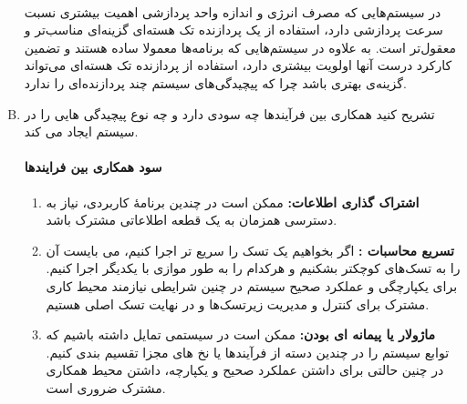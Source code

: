 \documentclass[]{article}
\begin{document}
\begin{enumerate}[(A)]
          \\
          در سیستم‌هایی که مصرف انرژی و اندازه واحد پردازشی اهمیت بیشتری نسبت سرعت پردازشی دارد،
          استفاده از یک پردازنده تک هسته‌ای گزینه‌ای مناسب‌تر و معقول‌تر است. به علاوه در سیستم‌هایی که
          برنامه‌ها معمولا ساده هستند و تضمین کارکرد درست آنها اولویت بیشتری دارد، استفاده از پردازنده تک هسته‌ای
          می‌تواند گزینه‌ی بهتری باشد چرا که پیچیدگی‌های سیستم چند پردازنده‌ای را ندارد.
          \pagebreak
    \item ﺗﺸﺮﯾﺢ ﮐﻨﯿﺪ ﻫﻤﮑﺎﺭﯼ ﺑﯿﻦ ﻓﺮﺁﯾﻨﺪﻫﺎ ﭼﻪ ﺳﻮﺩﯼ ﺩﺍﺭﺩ ﻭ ﭼﻪ ﻧﻮﻉ ﭘﯿﭽﯿﺪﮔﯽ ﻫﺎﯾﯽ ﺭﺍ ﺩﺭ ﺳﯿﺴﺘﻢ ﺍﯾﺠﺎﺩ ﻣﯽ ﮐﻨﺪ.
          \vspace{-0.5cm}
          \paragraph*{سود همکاری بین فرایندها}
          \begin{enumerate}[-]
              \item \textbf{اشتراک گذاری اطلاعات:}
                    ممکن است در چندین برنامۀ کاربردی، نیاز به دسترسی همزمان به یک قطعه اطلاعاتی مشترک باشد.
              \item \textbf{تسریع محاسبات :}
                    اگر بخواهیم یک تسک را سریع تر اجرا کنیم، می بایست آن را به تسک‌های کوچکتر بشکنیم و هرکدام را به طور موازی با یکدیگر اجرا کنیم.
                    برای یکپارچگی و عملکرد صحیح سیستم در چنین شرایطی نیازمند محیط کاری مشترک برای کنترل و مدیریت زیرتسک‌ها و در نهایت تسک اصلی هستیم.
              \item \textbf{ماژولار یا پیمانه ای بودن:}
                    ممکن است در سیستمی تمایل داشته باشیم که توابع سیستم را در چندین دسته از فرآیندها یا نخ های مجزا تقسیم بندی کنیم.
                    در چنین حالتی برای داشتن عملکرد صحیح و یکپارچه، داشتن محیط همکاری مشترک ضروری است.
          \end{enumerate}
          \vspace{-0.5cm}

\end{enumerate}
\end{document}

